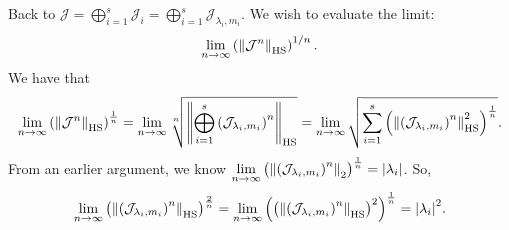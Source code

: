 \documentclass{article}
\begin{document}
\noindent Back to $\mathcal{J} = \bigoplus_{i=1}^s \mathcal{J}_i = \bigoplus_{i=1}^s \mathcal{J}_{\lambda_i,m_i}$. We wish to evaluate the limit:
\begin{align*}
\lim_{n\to \infty} \left(\norm{\mathcal{J}^n}_{\text{HS}}\right)^{1/n}.
\end{align*}
We have that
\begin{align*}
\lim\limits_{n\to\infty}\left( \norm{\mathcal{J}^n}_\text{HS} \right)^{\frac{1}{n}} =  \lim\limits_{n\to\infty}\sqrt[n]{ \norm{\bigoplus^{s}_{i=1}\left( \mathcal{J}_{\lambda_i, m_i}\right)^n}_\text{HS}}= \lim\limits_{n\to\infty}\sqrt{  \sum^{s}_{i=1}\left( \norm{\left( \mathcal{J}_{\lambda_i, m_i}\right)^n}_\text{HS}^2 \right)^\frac{1}{n}}.
\end{align*}
From an earlier argument, we know  
$ \lim\limits_{n\to\infty} \left(  \norm{\left(\mathcal{J}_{\lambda_i,m_i}\right)^n}_2 \right)^{\frac{1}{n}}  =  \abs{\lambda_i}$. So,
\begin{align*}
\lim\limits_{n\to\infty} \left(  \norm{\left(\mathcal{J}_{\lambda_i,m_i}\right)^n}_\text{HS} \right)^{\frac{2}{n}}  = \lim\limits_{n\to\infty} \left(\left(  \norm{\left(\mathcal{J}_{\lambda_i,m_i}\right)^n}_\text{HS} \right)^2\right)^{\frac{1}{n}}  =   \abs{\lambda_i}^2.
\end{align*}
\end{document}
